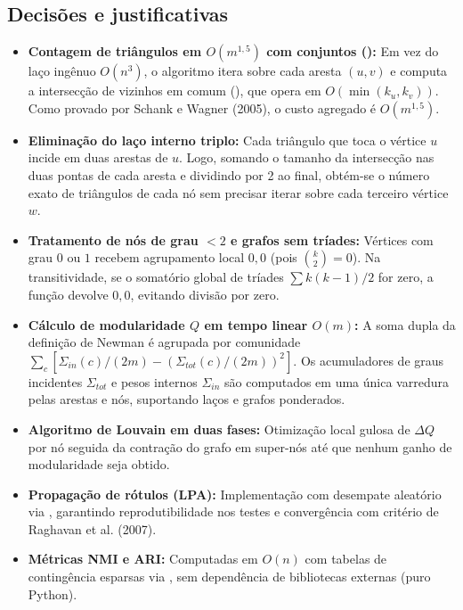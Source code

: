\subsection{Decisões e justificativas}
\begin{itemize}[leftmargin=*]
  \item \textbf{Contagem de triângulos em $O(m^{1,5})$ com conjuntos ():} Em vez do laço 
  ingênuo $O(n^3)$, o algoritmo itera sobre cada aresta $(u, v)$ e computa a intersecção de vizinhos 
  em comum (), que opera em $O(\min(k_u, k_v))$. 
  Como provado por Schank e Wagner (2005), o custo agregado é $O(m^{1,5})$.
  \item \textbf{Eliminação do laço interno triplo:} Cada triângulo que toca o vértice $u$ 
  incide em duas arestas de $u$. Logo, somando o tamanho da intersecção nas duas pontas de cada 
  aresta e dividindo por 2 ao final, obtém-se o número exato de triângulos de cada nó sem precisar 
  iterar sobre cada terceiro vértice $w$.
  \item \textbf{Tratamento de nós de grau $< 2$ e grafos sem tríades:} Vértices com grau $0$ ou $1$ 
  recebem agrupamento local $0{,}0$ (pois $\binom{k}{2} = 0$). 
  Na transitividade, se o somatório global de tríades $\sum k(k-1)/2$ for zero, a função 
  devolve $0{,}0$, evitando divisão por zero.
  \item \textbf{Cálculo de modularidade $Q$ em tempo linear $O(m)$:} A soma dupla da definição de
  Newman é agrupada por comunidade $\sum_c [ \Sigma_{in}(c)/(2m) - (\Sigma_{tot}(c)/(2m))^2 ]$.
  Os acumuladores de graus incidentes $\Sigma_{tot}$ e pesos internos $\Sigma_{in}$ são computados
  em uma única varredura pelas arestas e nós, suportando laços e grafos ponderados.
  \item \textbf{Algoritmo de Louvain em duas fases:} Otimização local gulosa de $\Delta Q$ por nó 
  seguida da contração do grafo em super-nós até que nenhum ganho de modularidade seja obtido.
  \item \textbf{Propagação de rótulos (LPA):} Implementação com desempate aleatório via 
  , garantindo reprodutibilidade nos testes e convergência com critério de Raghavan et al. (2007).
  \item \textbf{Métricas NMI e ARI:} Computadas em $O(n)$ com tabelas de contingência esparsas 
  via , sem dependência de bibliotecas externas (puro Python).
\end{itemize}

